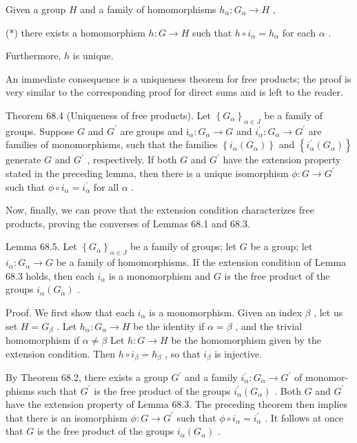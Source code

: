 Given a group \(H\) and a family of homomorphisms \({h}_{\alpha } : {G}_{\alpha } \rightarrow  H\) ,

(*) there exists a homomorphism \(h : G \rightarrow  H\) such that \(h \circ  {i}_{\alpha } = {h}_{\alpha }\) for each \(\alpha\) .

Furthermore, \(h\) is unique.

An immediate consequence is a uniqueness theorem for free products; the proof is very similar to the corresponding proof for direct sums and is left to the reader.

Theorem 68.4 (Uniqueness of free products). Let \({\left\{  {G}_{\alpha }\right\}  }_{\alpha  \in  J}\) be a family of groups. Suppose \(G\) and \({G}^{\prime }\) are groups and \({\mathrm{i}}_{\alpha } : {G}_{\alpha } \rightarrow  G\) and \({i}_{\alpha }^{\prime } : {G}_{\alpha } \rightarrow  {G}^{\prime }\) are families of monomorphisms, such that the families \(\left\{  {{i}_{\alpha }\left( {G}_{\alpha }\right) }\right\}\) and \(\left\{  {{i}_{\alpha }^{\prime }\left( {G}_{\alpha }\right) }\right\}\) generate \(G\) and \({G}^{\prime }\) , respectively. If both \(G\) and \({G}^{\prime }\) have the extension property stated in the preceding lemma, then there is a unique isomorphism \(\phi  : G \rightarrow  {G}^{\prime }\) such that \(\phi  \circ  {i}_{\alpha } = {i}_{\alpha }^{\prime }\) for all \(\alpha\) .

Now, finally, we can prove that the extension condition characterizes free products, proving the converses of Lemmas 68.1 and 68.3.

Lemma 68.5. Let \({\left\{  {G}_{\alpha }\right\}  }_{\alpha  \in  J}\) be a family of groups; let \(G\) be a group; let \({i}_{\alpha } : {G}_{\alpha } \rightarrow  G\) be a family of homomorphisms. If the extension condition of Lemma 68.3 holds, then each \({i}_{\alpha }\) is a monomorphism and \(G\) is the free product of the groups \({i}_{\alpha }\left( {G}_{\alpha }\right)\) .

Proof. We first show that each \({i}_{\alpha }\) is a monomorphism. Given an index \(\beta\) , let us set \(H = {G}_{\beta }\) . Let \({h}_{\alpha } : {G}_{\alpha } \rightarrow  H\) be the identity if \(\alpha  = \beta\) , and the trivial homomorphism if \(\alpha  \neq  \beta\) Let \(h : G \rightarrow  H\) be the homomorphism given by the extension condition. Then \(h \circ  {i}_{\beta } = {h}_{\beta }\) , so that \({i}_{\beta }\) is injective.

By Theorem 68.2, there exists a group \({G}^{\prime }\) and a family \({i}_{\alpha }^{\prime } : {G}_{\alpha } \rightarrow  {G}^{\prime }\) of monomor-phisms such that \({G}^{\prime }\) is the free product of the groups \({i}_{\alpha }^{\prime }\left( {G}_{\alpha }\right)\) . Both \(G\) and \({G}^{\prime }\) have the extension property of Lemma 68.3. The preceding theorem then implies that there is an isomorphism \(\phi  : G \rightarrow  {G}^{\prime }\) such that \(\phi  \circ  {i}_{\alpha } = {i}_{\alpha }^{\prime }\) . It follows at once that \(G\) is the free product of the groups \({i}_{\alpha }\left( {G}_{\alpha }\right)\) .

